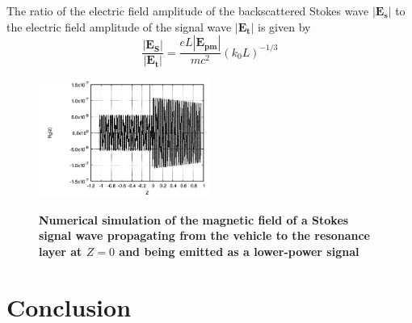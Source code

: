 \documentclass[twocolumn]{article}
\begin{document}
			The ratio of the electric field amplitude of the backscattered Stokes wave  $\left|\mathbf{E_s}\right|$ to the electric field amplitude of the signal wave $\left|\mathbf{E_t}\right|$ is given by
			\begin{equation}
				\frac{\left|\mathbf{E_S}\right|}{\left|\mathbf{E_t}\right|} = \frac{eL\left|\mathbf{E_{pm}}\right|}{mc^2} \left(k_0 L\right)^{-1/3}
			\end{equation}
			
			\begin{figure}[t]
				\centering
					\includegraphics[width = 0.5\textwidth]{Images/Stokes_NumericalSim2.png}
					\label{subfig:Stokes2}
				\caption{\textbf{Numerical simulation of the magnetic field of a Stokes signal wave propagating from the vehicle to the resonance layer at $Z=0$ and being emitted as a lower-power signal}}
				\label{fig:}
			\end{figure}

\section*{Conclusion}



\end{document}
